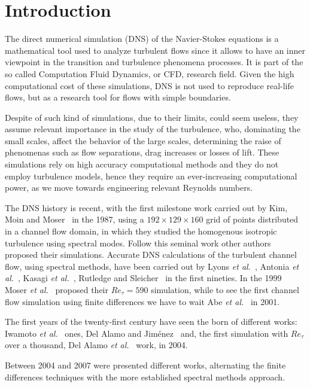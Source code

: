 \chapter{Introduction}
The direct numerical simulation (DNS) of the Navier-Stokes equations is a mathematical tool used to analyze turbulent flows since it allows to have an inner viewpoint in the transition and turbulence phenomena processes. It is part of the so called Computation Fluid Dynamics, or CFD, research field. 
Given the high computational cost of these simulations, DNS is not used to reproduce real-life flows, but as a research tool for flows with simple boundaries\cite{dns:tool}. \par
Despite of such kind of simulations, due to their limits, could seem useless, they assume relevant importance in the study of the turbulence, who, dominating the small scales, affect the behavior of the large scales, determining the raise of phenomenas such as flow separations, drag increases or losses of lift.
These simulations rely on high accuracy computational methods and they do not employ turbulence models, hence they require an ever-increasing computational power, as we move towards engineering relevant Reynolds numbers. \par
The DNS history is recent, with the first milestone work carried out by Kim, Moin and Moser~\cite{kim_moin_moser} in the 1987, using a $192\times 129 \times160$ grid of points distributed in a channel flow domain, in which they studied the homogenous isotropic turbulence using spectral modes. Follow this seminal work other authors proposed their simulations.
Accurate DNS calculations of the turbulent channel flow, using spectral methods, have been carried out by Lyons \emph{et al.}~\cite{Lyons}, Antonia \emph{et al.}~\cite{antonia_teitel_kim_browne_1992}, Kasagi \emph{et al.}~\cite{Kasagi}, Rutledge and Sleicher~\cite{Rutledge} in the first nineties. In the 1999 Moser \emph{et al.}~\cite{KMMans} proposed their $Re_{\tau}=590$ simulation, while to see the first channel flow simulation using finite differences we have to wait Abe \emph{et al.}~\cite{Abe} in 2001.\par
The first years of the twenty-first century have seen the born of different works: Iwamoto \emph{et al.}~\cite{Iwamoto} ones, Del Alamo and Jiménez~\cite{delalamo} and, the first simulation with $Re_{\tau}$ over a thousand, Del Alamo \emph{et al.}~\cite{delalamo2} work, in 2004. \par
Between 2004 and 2007 were presented different works, alternating the finite differences techniques with the more established spectral methods approach.
